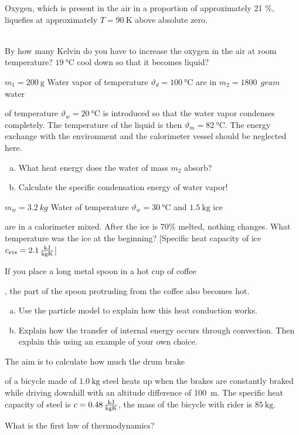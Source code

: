 \documentclass[a4paper]{article}
\begin{document}
\begin{enumerate}[1.]
		
		
		{\bf \item Oxygen, which is present in the air in a proportion of approximately 21 \%, liquefies at approximately $ T=\SI{90}{\kelvin}$ above absolute zero.}\\
		By how many Kelvin do you have to increase the oxygen in the air at room temperature?
		$\SI{19}{\celsius}$ cool down so that it becomes liquid?
		
		
		{\bf \item $m_1=\SI{200}{\gram}$ Water vapor of temperature $\vartheta _{d} =\SI{100}{\celsius}$ are in $m_2=\SI{1800}{\ gram}$ water} of temperature $\vartheta _{w} = \SI{20}{\celsius} $ is introduced so that the water vapor condenses completely. The temperature of the liquid is then
		$\vartheta _{m} = \SI{82}{\celsius} $. The energy exchange with the environment and the calorimeter vessel should be neglected here.
		\begin{enumerate}[a)]
			\item What heat energy does the water of mass $m_2$ absorb?
			\item Calculate the specific condensation energy of water vapor!
		\end{enumerate}
		
		{\bf \item $m_w=3.2~kg$ Water of temperature $\vartheta_w = \SI{30}{\celsius}$ and $\SI{1.5}{\kilogram}$ ice} are in a calorimeter mixed. After the ice is 70\% melted, nothing changes. What temperature was the ice at the beginning?
		[Specific heat capacity of ice $c_{eis}= \SI{2,1}{\kilo\joule \over \kilogram\kelvin}$]
		
		
		{\bf \item If you place a long metal spoon in a hot cup of coffee}, the part of the spoon protruding from the coffee also becomes hot.
		\begin{enumerate}[a)]
			\item Use the particle model to explain how this heat conduction works.
			\item Explain how the transfer of internal energy occurs through convection. Then explain this using an example of your own choice.
		\end{enumerate}
		
		{\bf \item The aim is to calculate how much the drum brake} of a bicycle made of $\SI{1.0}{\kilogram}$ steel heats up when the brakes are constantly braked while driving downhill with an altitude difference of 100~m. The specific heat capacity of steel is $c=\SI{0.48}{\kilo\joule \over \kilogram\kelvin} $, the mass of the bicycle with rider is $\SI{85}{\kilogram}$.
			
			{\bf \item What is the first law of thermodynamics?}
		\end{enumerate}
\end{document}
